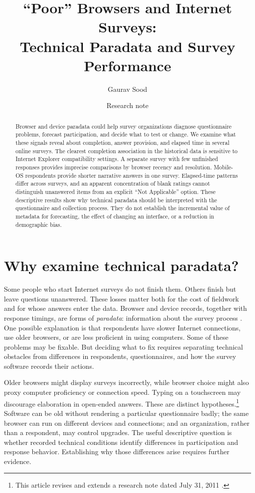 \documentclass[11pt]{article}
\title{``Poor'' Browsers and Internet Surveys:\\Technical Paradata and Survey Performance}
\author{Gaurav Sood}
\date{Research note}
\begin{document}
\maketitle

\begin{abstract}
\noindent Browser and device paradata could help survey organizations diagnose questionnaire problems, forecast participation, and decide what to test or change. We examine what these signals reveal about completion, answer provision, and elapsed time in several online surveys. The clearest completion association in the historical data is sensitive to Internet Explorer compatibility settings. A separate survey with few unfinished responses provides imprecise comparisons by browser recency and resolution. Mobile-OS respondents provide shorter narrative answers in one survey. Elapsed-time patterns differ across surveys, and an apparent concentration of blank ratings cannot distinguish unanswered items from an explicit ``Not Applicable'' option. These descriptive results show why technical paradata should be interpreted with the questionnaire and collection process. They do not establish the incremental value of metadata for forecasting, the effect of changing an interface, or a reduction in demographic bias.
\end{abstract}

\section{Why examine technical paradata?}

Some people who start Internet surveys do not finish them. Others finish but leave questions unanswered. These losses matter both for the cost of fieldwork and for whose answers enter the data. Browser and device records, together with response timings, are forms of \emph{paradata}: information about the survey process \citep{callegaro2013}. One possible explanation is that respondents have slower Internet connections, use older browsers, or are less proficient in using computers. Some of these problems may be fixable. But deciding what to fix requires separating technical obstacles from differences in respondents, questionnaires, and how the survey software records their actions.

Older browsers might display surveys incorrectly, while browser choice might also proxy computer proficiency or connection speed. Typing on a touchscreen may discourage elaboration in open-ended answers. These are distinct hypotheses.\footnote{This article revises and extends a research note dated July 31, 2011 \citep{sood2011}.} Software can be old without rendering a particular questionnaire badly; the same browser can run on different devices and connections; and an organization, rather than a respondent, may control upgrades. The useful descriptive question is whether recorded technical conditions identify differences in participation and response behavior. Establishing why those differences arise requires further evidence.
\end{document}
